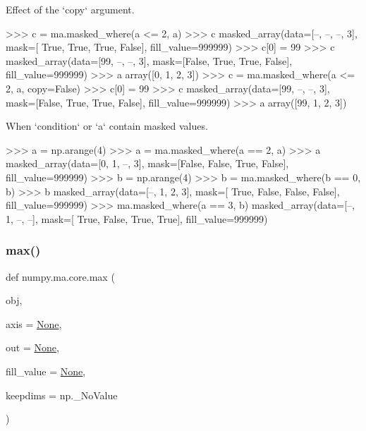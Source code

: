 \begin{DoxyVerb}
Effect of the `copy` argument.

>>> c = ma.masked_where(a <= 2, a)
>>> c
masked_array(data=[--, --, --, 3],
             mask=[ True,  True,  True, False],
       fill_value=999999)
>>> c[0] = 99
>>> c
masked_array(data=[99, --, --, 3],
             mask=[False,  True,  True, False],
       fill_value=999999)
>>> a
array([0, 1, 2, 3])
>>> c = ma.masked_where(a <= 2, a, copy=False)
>>> c[0] = 99
>>> c
masked_array(data=[99, --, --, 3],
             mask=[False,  True,  True, False],
       fill_value=999999)
>>> a
array([99,  1,  2,  3])

When `condition` or `a` contain masked values.

>>> a = np.arange(4)
>>> a = ma.masked_where(a == 2, a)
>>> a
masked_array(data=[0, 1, --, 3],
             mask=[False, False,  True, False],
       fill_value=999999)
>>> b = np.arange(4)
>>> b = ma.masked_where(b == 0, b)
>>> b
masked_array(data=[--, 1, 2, 3],
             mask=[ True, False, False, False],
       fill_value=999999)
>>> ma.masked_where(a == 3, b)
masked_array(data=[--, 1, --, --],
             mask=[ True, False,  True,  True],
       fill_value=999999)\end{DoxyVerb}
 \mbox{\label{namespacenumpy_1_1ma_1_1core_a60f41b3ef35da9042299c6b19d7c8c56}} 
\subsubsection{\texorpdfstring{max()}{max()}}
{\footnotesize\ttfamily def numpy.\+ma.\+core.\+max (\begin{DoxyParamCaption}\item[{}]{obj,  }\item[{}]{axis = {\ttfamily \hyperlink{namespacenumpy_1_1ma_1_1core_a647ee1848dfa3692fe35a663a2aa40b3}{None}},  }\item[{}]{out = {\ttfamily \hyperlink{namespacenumpy_1_1ma_1_1core_a647ee1848dfa3692fe35a663a2aa40b3}{None}},  }\item[{}]{fill\+\_\+value = {\ttfamily \hyperlink{namespacenumpy_1_1ma_1_1core_a647ee1848dfa3692fe35a663a2aa40b3}{None}},  }\item[{}]{keepdims = {\ttfamily np.\+\_\+NoValue} }\end{DoxyParamCaption})}

\mbox{\label{namespacenumpy_1_1ma_1_1core_a59cecb736927db32ee18c709ddc253d2}} 
